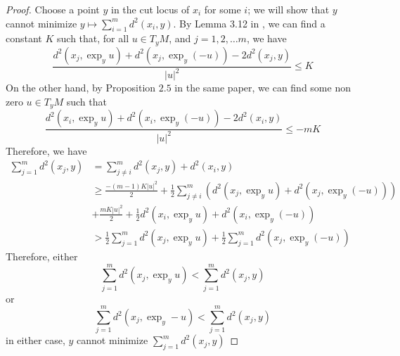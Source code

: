 \begin{proof}
	Choose a point \( y \) in the cut locus of \( x _ { i } \) for some \( i \);
	we will show that \( y \) cannot minimize \( y \mapsto \sum _ { i = 1 } ^ { m } d ^ { 2 } \left( x _ { i } , y \right) . \)
	By Lemma 3.12 in \cite{cordero2001riemannian}, we can find a constant \( K \) such that, for all \( u \in T _ { y } M \), and \( j = 1,2 , \ldots m \), we have
	\[
	\frac { d ^ { 2 } \left( x _ { j } , \exp _ { y } u \right) + d ^ { 2 } \left( x _ { j } , \exp _ { y } ( - u ) \right) - 2 d ^ { 2 } \left( x _ { j } , y \right) } { | u | ^ { 2 } } \leq K
\]
	On the other hand, by Proposition \( 2.5 \) in the same paper, we can find some non
	zero \( u \in T _ { y } M \) such that
	\[ 
	\frac { d ^ { 2 } \left( x _ { i } , \exp _ { y } u \right) + d ^ { 2 } \left( x _ { i } , \exp _ { y } ( - u ) \right) - 2 d ^ { 2 } \left( x _ { i } , y \right) } { | u | ^ { 2 } } \leq - m K
\]
	Therefore, we have
	 \begin{align*}
	\sum _ { j = 1 } ^ { m } d ^ { 2 } \left( x _ { j } , y \right) & = \sum _ { j \neq i } ^ { m } d ^ { 2 } \left( x _ { j } , y \right) + d ^ { 2 } \left( x _ { i } , y \right) \\ & \geq \frac { - ( m - 1 ) K | u | ^ { 2 } } { 2 } + \frac { 1 } { 2 } \sum _ { j \neq i } ^ { m } \left( d ^ { 2 } \left( x _ { j } , \exp _ { y } u \right) + d ^ { 2 } \left( x _ { j } , \exp _ { y } ( - u ) \right) \right) \\ & + \frac { m K | u | ^ { 2 } } { 2 } + \frac { 1 } { 2 } d ^ { 2 } \left( x _ { i } , \exp _ { y } u \right) + d ^ { 2 } \left( x _ { i } , \exp _ { y } ( - u ) \right) \\ & > \frac { 1 } { 2 } \sum _ { j = 1 } ^ { m } d ^ { 2 } \left( x _ { j } , \exp _ { y } u \right) + \frac { 1 } { 2 } \sum _ { j = 1 } ^ { m } d ^ { 2 } \left( x _ { j } , \exp _ { y } ( - u ) \right) 
\end{align*}
	Therefore, either
	\[ \sum _ { j = 1 } ^ { m } d ^ { 2 } \left( x _ { j } , \exp _ { y } u \right) < \sum _ { j = 1 } ^ { m } d ^ { 2 } \left( x _ { j } , y \right) \]
	or
	\[ \sum _ { j = 1 } ^ { m } d ^ { 2 } \left( x _ { j } , \exp _ { y } - u \right) < \sum _ { j = 1 } ^ { m } d ^ { 2 } \left( x _ { j } , y \right) \]
	in either case, \( y \) cannot minimize \( \sum _ { j = 1 } ^ { m } d ^ { 2 } \left( x _ { j } , y \right) \)
\end{proof}

